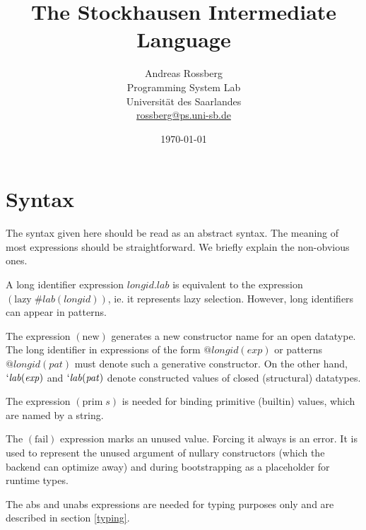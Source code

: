 \documentclass[twoside]{article}
\newcommand{\x}[1]{\mathit{#1}}
\newcommand{\f}[1]{\mbox{#1}}
\newcommand{\lab}{\x{lab}}
\newcommand{\longid}{\x{longid}}
\renewcommand{\exp}{\x{exp}}
\newcommand{\pat}{\x{pat}}
\begin{document}

\title{The Stockhausen Intermediate Language}
\author{Andreas Rossberg \\
Programming System Lab \\
Universit\"at des Saarlandes \\
\url{rossberg@ps.uni-sb.de}}
\date{\today}

\maketitle


\section{Syntax}
\label{syntax}

The syntax given here should be read as an abstract syntax. The meaning of most expressions should be straightforward. We briefly explain the non-obvious ones.

A long identifier expression $\longid.\lab$ is equivalent to the expression $(\f{lazy}\; \#\lab(\longid))$, ie. it represents lazy selection. However, long identifiers can appear in patterns.

The expression $(\f{new})$ generates a new constructor name for an open datatype. The long identifier in expressions of the form $@\longid(\exp)$ or patterns $@\longid(\pat)$ must denote such a generative constructor. On the other hand, $`\lab(\exp)$ and $`\lab(\pat)$ denote constructed values of closed (structural) datatypes.

The expression $(\f{prim}\;s)$ is needed for binding primitive (builtin) values, which are named by a string.

The $(\f{fail})$ expression marks an unused value. Forcing it always is an error. It is used to represent the unused argument of nullary constructors (which the backend can optimize away) and during bootstrapping as a placeholder for runtime types.

The \f{abs} and \f{unabs} expressions are needed for typing purposes only and are described in section \ref{typing}.
\end{document}
